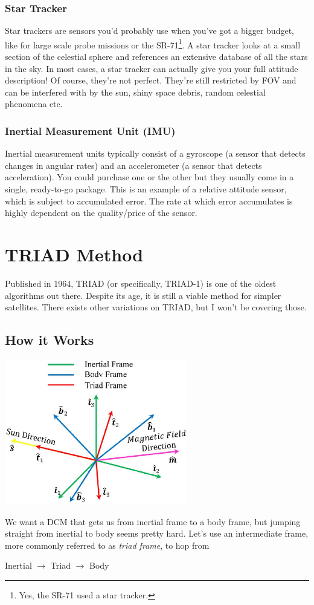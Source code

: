 \documentclass[a4paper,14pt]{extreport}
\begin{document}
\subsection{Star Tracker}
Star trackers are sensors you'd probably use when you've got a bigger budget, like for large scale probe missions or the SR-71\footnote{Yes, the SR-71 used a star tracker.}. A star tracker looks at a small section of the celestial sphere and references an extensive database of all the stars in the sky. In most cases, a star tracker can actually give you your full attitude description! Of course, they're not perfect. They're still restricted by FOV and can be interfered with by the sun, shiny space debris, random celestial phenomena etc.
\subsection{Inertial Measurement Unit (IMU)}
Inertial measurement units typically consist of a gyroscope (a sensor that detects changes in angular rates) and an accelerometer (a sensor that detects acceleration). You could purchase one or the other but they usually come in a single, ready-to-go package. This is an example of a relative attitude sensor, which is subject to accumulated error. The rate at which error accumulates is highly dependent on the quality/price of the sensor.
\chapter{TRIAD Method}
Published in 1964, TRIAD (or specifically, TRIAD-1) is one of the oldest algorithms out there. Despite its age, it is still a viable method for simpler satellites. There exists other variations on TRIAD, but I won't be covering those.

\section{How it Works}
\begin{center}
\includegraphics[width=8cm]{triad}
\end{center}
We want a DCM that gets us from inertial frame to a body frame, but jumping straight from inertial to body seems pretty hard. Let's use an intermediate frame, more commonly referred to as \emph{triad frame}, to hop from 
\begin{center}Inertial $\rightarrow$ Triad $\rightarrow$ Body\end{center}
\end{document}
